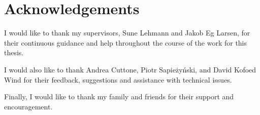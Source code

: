 \chapter{Acknowledgements}

I would like to thank my supervisors, Sune Lehmann and Jakob Eg Larsen, for
their continuous guidance and help throughout the course of the work for this
thesis.

I would also like to thank Andrea Cuttone, Piotr Sapieżyński, and David Kofoed
Wind for their feedback, suggestions and assistance with technical issues.

Finally, I would like to thank my family and friends for their support and
encouragement.

